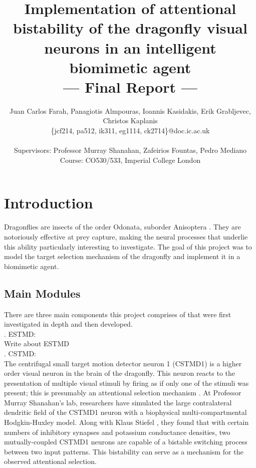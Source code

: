 \documentclass[a4paper,11pt]{article}
\title{Implementation of attentional bistability of the dragonfly visual neurons in an intelligent biomimetic agent\\\Large{--- Final Report ---}}
\author{Juan Carlos Farah, Panagiotis Almpouras, Ioannis Kasidakis, Erik Grabljevec, Christos Kaplanis\\
       \{jcf214, pa512, ik311, eg1114, ck2714\}@doc.ic.ac.uk\\ \\
       \small{Supervisors: Professor Murray Shanahan, Zafeirios Fountas, Pedro Mediano}\\
       \small{Course: CO530/533, Imperial College London}
}
\begin{document}
\maketitle

\section{Introduction}

Dragonflies are insects of the order Odonata, suborder Anisoptera \cite{dfwiki}. They are notoriously effective at prey capture, making the neural processes that underlie this ability particularly interesting to investigate.  The goal of this project was to model the target selection mechanism of the dragonfly and implement it in a biomimetic agent.

\subsection{Main Modules} 
There are three main components this project comprises  of that were first investigated in depth and then developed.\\

. ESTMD:\\
Write about ESTMD\\

. CSTMD:\\
The centrifugal small target motion detector neuron 1 (CSTMD1) is a higher order visual neuron in the brain of the dragonfly. This neuron reacts to the presentation of multiple visual stimuli by firing as if only one of the stimuli was present; this is presumably an attentional selection mechanism \cite{w13}. At Professor Murray Shanahan's lab, researchers have simulated the large contralateral dendritic field of the CSTMD1 neuron with a biophysical multi-compartmental Hodgkin-Huxley model. Along with Klaus Stiefel \cite{ne13}, they found that with certain numbers of inhibitory synapses and potassium conductance densities, two mutually-coupled CSTMD1 neurons are capable of a bistable switching process between two input patterns. This bistability can serve as a mechanism for the observed attentional selection.\\
\end{document}
